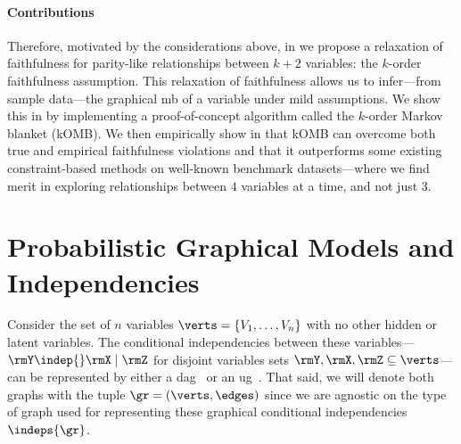 \documentclass[accepted]{uai2026} %
\theoremstyle{plain}
\theoremstyle{definition}
\theoremstyle{remark}
\newcommand{\todo}[1]{\colorbox{yellow}{#1}}
\begin{document}
\paragraph{Contributions}
Therefore, motivated by the considerations above, in  we
propose a relaxation of faithfulness for parity-like relationships
between $k+2$ variables: the $k$-order faithfulness assumption. This
relaxation of faithfulness allows us to infer---from sample
data---the graphical \acrlong{mb} of a variable under mild
assumptions. We show this in  by implementing a
proof-of-concept algorithm called the $k$-order Markov blanket
(kOMB). We then empirically show in  that kOMB can
overcome both true and empirical faithfulness violations and that it
outperforms some existing constraint-based methods on well-known
benchmark datasets---where we find merit in exploring relationships
between $4$ variables at a time, and not just $3$.


\section{Probabilistic Graphical Models and Independencies}
Consider the set of $n$ variables $\verts=\{V_{1},\ldots,V_{n}\}$ with
no other hidden or latent variables. The conditional
independencies between these variables---$\rmY \indep{} \rmX \mid \rmZ$
for disjoint variables sets $\rmY,\rmX,\rmZ\subseteq\verts$---can be
represented by either a \acrfull{dag}~\citep{pearl1988} or an
\acrfull{ug}~\cite{lauritzen1996}.
That said, we will denote both graphs with the tuple
$\gr=(\verts,\edges)$ since we are agnostic on the type of graph used
for representing these graphical conditional independencies
$\indeps{\gr}$.
\end{document}
